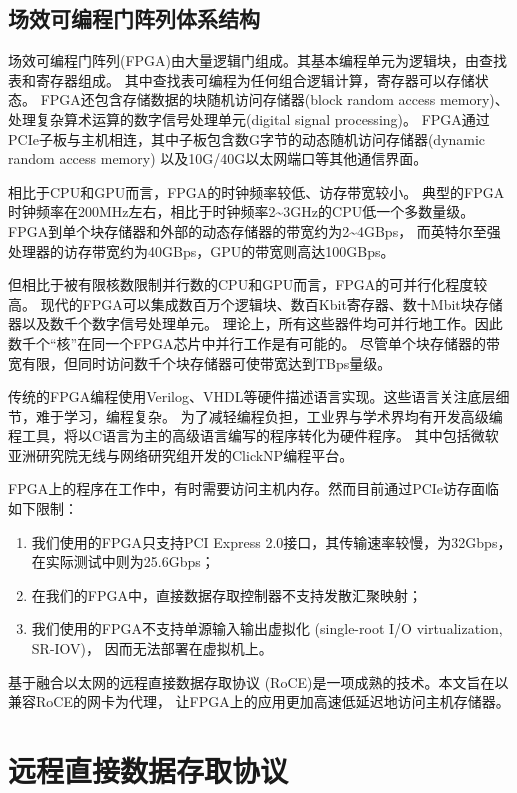 \section{场效可编程门阵列体系结构}
场效可编程门阵列(FPGA)由大量逻辑门组成。其基本编程单元为逻辑块，由查找表和寄存器组成。
其中查找表可编程为任何组合逻辑计算，寄存器可以存储状态。
FPGA还包含存储数据的块随机访问存储器(block random access memory)、
处理复杂算术运算的数字信号处理单元(digital signal processing)。
FPGA通过PCIe子板与主机相连，其中子板包含数G字节的动态随机访问存储器(dynamic random access memory)
以及10G/40G以太网端口等其他通信界面。

相比于CPU和GPU而言，FPGA的时钟频率较低、访存带宽较小。
典型的FPGA时钟频率在200MHz左右，相比于时钟频率2\textasciitilde 3GHz的CPU低一个多数量级。
FPGA到单个块存储器和外部的动态存储器的带宽约为2\textasciitilde 4GBps，
而英特尔至强处理器的访存带宽约为40GBps，GPU的带宽则高达100GBps。

但相比于被有限核数限制并行数的CPU和GPU而言，FPGA的可并行化程度较高。
现代的FPGA可以集成数百万个逻辑块、数百Kbit寄存器、数十Mbit块存储器以及数千个数字信号处理单元。
理论上，所有这些器件均可并行地工作。因此数千个“核”在同一个FPGA芯片中并行工作是有可能的。
尽管单个块存储器的带宽有限，但同时访问数千个块存储器可使带宽达到TBps量级。

传统的FPGA编程使用Verilog、VHDL等硬件描述语言实现。这些语言关注底层细节，难于学习，编程复杂。
为了减轻编程负担，工业界与学术界均有开发高级编程工具，将以C语言为主的高级语言编写的程序转化为硬件程序。
其中包括微软亚洲研究院无线与网络研究组开发的ClickNP编程平台\cite{clicknp}。

FPGA上的程序在工作中，有时需要访问主机内存。然而目前通过PCIe访存面临如下限制：
\begin{enumerate}
\item 我们使用的FPGA只支持PCI Express 2.0\cite{pcie}接口，其传输速率较慢，为32Gbps，在实际测试中则为25.6Gbps；
\item 在我们的FPGA中，直接数据存取控制器不支持发散汇聚映射\cite{chapter3}；
\item 我们使用的FPGA不支持单源输入输出虚拟化 (single-root I/O virtualization, SR-IOV)\cite{irsov}，
因而无法部署在虚拟机上。
\end{enumerate}

基于融合以太网的远程直接数据存取协议 (RoCE)是一项成熟的技术。本文旨在以兼容RoCE的网卡为代理，
让FPGA上的应用更加高速低延迟地访问主机存储器。

\chapter{远程直接数据存取协议}
